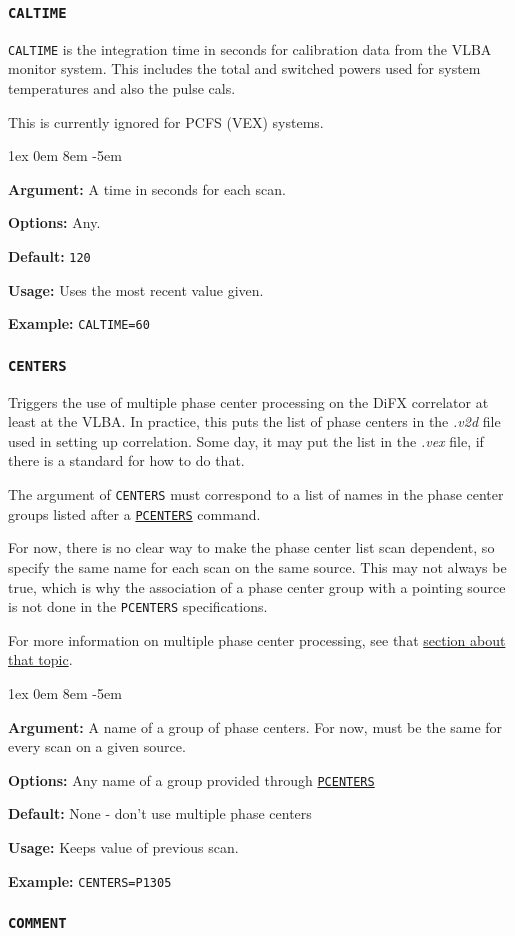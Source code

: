 \documentclass{report}
\newcommand{\rcwbox}[5]{
  \begin{list}{}{\parsep 1ex  \itemsep 0em
                 \leftmargin 8em  \itemindent -5em }
    \item {\bf Argument:} #1
    \item {\bf Options:}  #2
    \item {\bf Default:}  #3
    \item {\bf Usage:}    #4
    \item {\bf Example:}  #5
  \end{list}
}
\begin{document}
\subsubsection{\label{MP:CALTIME}{\tt CALTIME}}

{\tt CALTIME} is the integration time in seconds for calibration
data from the VLBA monitor system. This includes the total and
switched powers used for system temperatures and also the pulse
cals.

This is currently ignored for PCFS (VEX) systems.

\rcwbox
{A time in seconds for each scan.}
{Any.}
{{\tt 120}}
{Uses the most recent value given.}
{{\tt CALTIME=60}}


\subsubsection{\label{MP:CENTERS}{\tt CENTERS}}

Triggers the use of multiple phase center processing on the
DiFX correlator at least at the VLBA.  In practice, this puts
the list of phase centers in the {\sl .v2d} file used in
setting up correlation.  Some day, it may put the list in
the {\sl .vex} file, if there is a standard for how to do that.

The argument of {\tt CENTERS} must correspond to a list of
names in the phase center groups listed after a
{\hyperref[MP:PCENTERS]{{\tt PCENTERS}}} command.

For now, there is no clear way to make the phase center list
scan dependent, so specify the same name for each scan on the
same source.  This may not always be true, which is why the
association of a phase center group with a pointing
source is not done in the {\tt PCENTERS} specifications.

For more information on multiple phase center processing, see
that 
{\hyperref[SEC:MULTIPLE_CENTERS]{section about that topic}}.

\rcwbox
{A name of a group of phase centers.  For now, must be the
same for every scan on a given source.}
{Any name of a group provided through 
{\hyperref[MP:PCENTERS]{{\tt PCENTERS}}}}
{None - don't use multiple phase centers}
{Keeps value of previous scan.}
{\tt CENTERS=P1305}

\subsubsection{\label{MP:COMMENT}{\tt COMMENT}}
\end{document}
